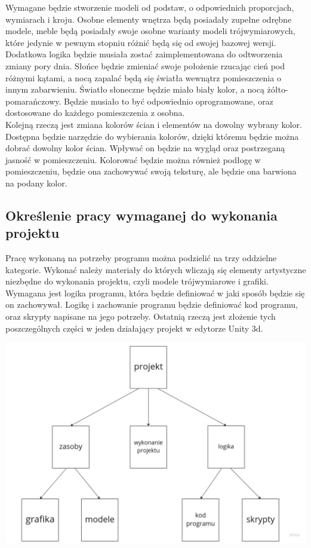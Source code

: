 \documentclass{article} %
\begin{document}
        Wymagane będzie stworzenie modeli od podstaw, o odpowiednich proporcjach, wymiarach i kroju. Osobne elementy wnętrza będą posiadały zupełne odrębne modele, meble będą posiadały swoje osobne warianty modeli trójwymiarowych, które jedynie w pewnym stopniu różnić będą się od swojej bazowej wersji.
        \\
        
        Dodatkowa logika będzie musiała zostać zaimplementowana do odtworzenia zmiany pory dnia. Słońce będzie zmieniać swoje położenie rzucając cień pod różnymi kątami, a nocą zapalać będą się światła wewnątrz pomieszczenia o innym zabarwieniu. Światło słoneczne będzie miało biały kolor, a nocą żółto-pomarańczowy. Będzie musiało to być odpowiednio oprogramowane, oraz dostosowane do każdego pomieszczenia z osobna.
        \\
        
        Kolejną rzeczą jest zmiana kolorów ścian i elementów na dowolny wybrany kolor. Dostępna będzie narzędzie do wybierania kolorów, dzięki któremu będzie można dobrać dowolny kolor ścian. Wpływać on będzie na wygląd oraz postrzeganą jasność w pomieszczeniu. Kolorować będzie można również podłogę w pomieszczeniu, będzie ona zachowywać swoją teksturę, ale będzie ona barwiona na podany kolor.
        \\
        
    \subsection{Określenie pracy wymaganej do wykonania projektu}
        Pracę wykonaną na potrzeby programu można podzielić na trzy oddzielne kategorie. Wykonać należy materiały do których wliczają się elementy artystyczne niezbędne do wykonania projektu, czyli modele trójwymiarowe i grafiki. Wymagana jest logika programu, która będzie definiować w jaki sposób będzie się on zachowywał. Logikę i zachowanie programu będzie definiować kod programu, oraz skrypty napisane na jego potrzeby. Ostatnią rzeczą jest złożenie tych poszczególnych części w jeden działający projekt w edytorze Unity 3d.
        \\
        
        \begin{center}
            \includegraphics[scale=0.3,keepaspectratio]{images/diagrams/1 Project work categories.jpg}
        \end{center}
\end{document}
